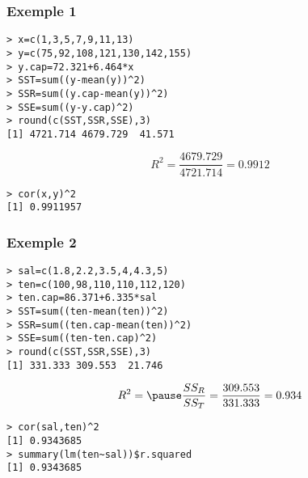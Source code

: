 \documentclass[12pt,t]{beamer}
\theoremstyle{plain}
\theoremstyle{definition}
\begin{document}
%
%

\begin{frame}[fragile]
\frametitle{Exemple 1}
\vspace*{-2ex}

\begin{verbatim}
> x=c(1,3,5,7,9,11,13)
> y=c(75,92,108,121,130,142,155)
> y.cap=72.321+6.464*x
> SST=sum((y-mean(y))^2)
> SSR=sum((y.cap-mean(y))^2)
> SSE=sum((y-y.cap)^2)
> round(c(SST,SSR,SSE),3)
[1] 4721.714 4679.729  41.571
\end{verbatim}
$$
R^2=\frac{4679.729}{4721.714}=0.9912
$$
\begin{verbatim}
> cor(x,y)^2
[1] 0.9911957
\end{verbatim}
\end{frame}

\begin{frame}[fragile]
\frametitle{Exemple 2}
\vspace*{-3ex}

\small \begin{verbatim}
> sal=c(1.8,2.2,3.5,4,4.3,5)
> ten=c(100,98,110,110,112,120)
> ten.cap=86.371+6.335*sal
> SST=sum((ten-mean(ten))^2)
> SSR=sum((ten.cap-mean(ten))^2)
> SSE=sum((ten-ten.cap)^2)
> round(c(SST,SSR,SSE),3)
[1] 331.333 309.553  21.746
\end{verbatim}
$$
R^2=\pause\frac{SS_R}{SS_T}=\frac{309.553}{331.333}=0.934
$$
\begin{verbatim}
> cor(sal,ten)^2
[1] 0.9343685
> summary(lm(ten~sal))$r.squared
[1] 0.9343685
\end{verbatim}
\end{frame}
\end{document}
